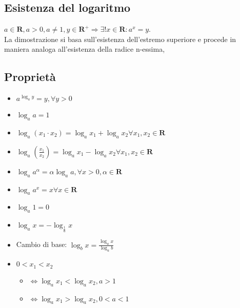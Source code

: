 \subsection{Esistenza del logaritmo}
$a\in \mathbf{R}, a>0, a\neq 1, y\in \mathbf{R^+}\Rightarrow\exists!x\in\mathbf{R}:a^x=y$.\\
La dimostrazione si basa sull'esistenza dell'estremo superiore e procede in maniera analoga all'esistenza della radice n-essima,
\subsection{Propriet\`a}
\begin{itemize}
\item $a^{\log_a y}=y,\forall y>0$
\item $\log_a a =1$
\item $\log_a(x_1\cdot x_2)=\log_a x_1 + \log_a x_2 \forall x_1, x_2 \in \mathbf{R}$
\item $\log_a(\frac{x_1}{x_2})=\log_a x_1 - \log_a x_2 \forall x_1, x_2 \in \mathbf{R}$
\item $\log_a a^{\alpha} =\alpha\log_a a, \forall x>0, \alpha \in \mathbf{R}$
\item $\log_a a^x =x \forall x\in \mathbf{R}$
\item $\log_a 1 =0$
\item $\log_a x =-\log_{\frac{1}{a}} x$
\item Cambio di base: $\log_b x=\frac{\log_a x}{\log_a b}$
\item $0<x_1<x_2$
\begin{itemize}
\item $\Leftrightarrow \log_a x_1<\log_a x_2, a>1$
\item $\Leftrightarrow \log_a x_1>\log_a x_2, 0<a<1$
\end{itemize}
\end{itemize}